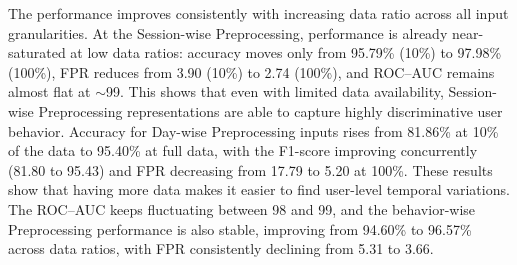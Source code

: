 The performance improves consistently with increasing data ratio across all input granularities. At the Session-wise Preprocessing, performance is already near-saturated at low data ratios: accuracy moves only from 95.79\% (10\%) to 97.98\% (100\%), FPR reduces from 3.90 (10\%) to 2.74 (100\%), and ROC–AUC remains almost flat at $\sim$99. This shows that even with limited data availability, Session-wise Preprocessing representations are able to capture highly discriminative user behavior. Accuracy for Day-wise Preprocessing inputs rises from 81.86\% at 10\% of the data to 95.40\% at full data, with the F1-score improving concurrently (81.80 to 95.43) and FPR decreasing from 17.79 to 5.20 at 100\%. These results show that having more data makes it easier to find user-level temporal variations. The ROC–AUC keeps fluctuating between 98 and 99, and the behavior-wise Preprocessing performance is also stable, improving from 94.60\% to 96.57\% across data ratios, with FPR consistently declining from 5.31 to 3.66.

